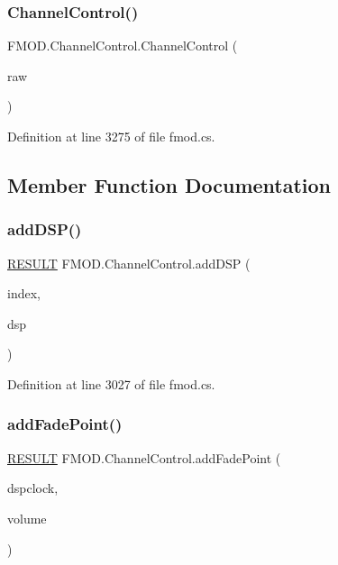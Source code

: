 \subsubsection{\texorpdfstring{Channel\+Control()}{ChannelControl()}}
{\footnotesize\ttfamily F\+M\+O\+D.\+Channel\+Control.\+Channel\+Control (\begin{DoxyParamCaption}\item[{Int\+Ptr}]{raw }\end{DoxyParamCaption})\hspace{0.3cm}{\ttfamily [protected]}}



Definition at line 3275 of file fmod.\+cs.



\subsection{Member Function Documentation}
\mbox{\label{class_f_m_o_d_1_1_channel_control_a0ad6d22033d2b0143b22b98e57786dcd}} 
\subsubsection{\texorpdfstring{add\+D\+S\+P()}{addDSP()}}
{\footnotesize\ttfamily \hyperlink{namespace_f_m_o_d_a305d1176ef3f8c8815861a60407ac33d}{R\+E\+S\+U\+LT} F\+M\+O\+D.\+Channel\+Control.\+add\+D\+SP (\begin{DoxyParamCaption}\item[{int}]{index,  }\item[{\hyperlink{class_f_m_o_d_1_1_d_s_p}{D\+SP}}]{dsp }\end{DoxyParamCaption})}



Definition at line 3027 of file fmod.\+cs.

\mbox{\label{class_f_m_o_d_1_1_channel_control_ad0454a8820a4429676951e62bd936a7c}} 
\subsubsection{\texorpdfstring{add\+Fade\+Point()}{addFadePoint()}}
{\footnotesize\ttfamily \hyperlink{namespace_f_m_o_d_a305d1176ef3f8c8815861a60407ac33d}{R\+E\+S\+U\+LT} F\+M\+O\+D.\+Channel\+Control.\+add\+Fade\+Point (\begin{DoxyParamCaption}\item[{ulong}]{dspclock,  }\item[{float}]{volume }\end{DoxyParamCaption})}



